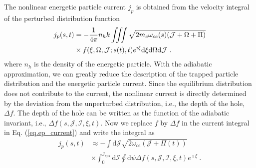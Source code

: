


The nonlinear energetic particle current $j_p$ is obtained from the velocity integral of the perturbed distribution function 
\cite{zheng2024}
\begin{equation}\label{eq.ep_current}
    \begin{aligned}
j_p(s,t) & = -\frac{1}{ 4 \pi } n_h k \iiint \sqrt{2m_e\omega_{ce}(s)(\mathcal{J}+\Omega+\Pi)} 
 \\
 &\times f(\xi,\Omega,\mathcal{J};s(t),t)e^{\imath \xi} \rm d \xi \rm d \Omega \rm d \mathcal{J}~.
    \end{aligned}
\end{equation}
where $n_h$ is the density of the energetic particle.
With the adiabatic approximation, we can greatly reduce the description of the trapped particle distribution and the energetic particle current.
Since the equilibrium distribution does not contribute to the current, the nonlinear current is directly determined by 
the deviation from the unperturbed distribution, i.e., the depth of the hole,
$\Delta f$.
The depth of the hole can be written as the function of the adiabatic invariant, i.e., $\Delta f(s,\mathcal{J},\mathcal{I},\xi,t)$.
Now we replace $f$ by $\Delta f$ in the current integral in Eq. (\ref{eq.ep_current}) and write  the integral as
\begin{equation}
\begin{aligned}
    j_p(s,t) & \approx - \int\mathrm{d} \mathcal{J} \sqrt{2 \omega_{ce} (\mathcal{J} + \Pi(t))}
    \\
    &\times \int_0^{\mathcal{I}_{\mathrm{s p x}}}  \mathrm{d}\mathcal{I}  \oint \mathrm{d}\psi  \Delta f(s,\mathcal{J},\mathcal{I},\xi,t)e^{\imath \xi}  ~.
\end{aligned}
\end{equation}
